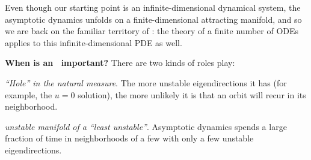 % 
% 
% 
Even though our starting point
is an infinite-dimensional dynamical system, the asymptotic dynamics
unfolds on a finite-dimensional attracting manifold, and so we are back on
the familiar territory of :
the theory of a finite number of ODEs applies to this
infinite-dimensional PDE as well.

    {\bf When is an \eqv\ important?} There are two kinds of roles
{\eqva} play:

{\em ``Hole'' in the natural measure}.
The more unstable eigendirections it has (for example, the
$u=0$ solution), the more unlikely it is  that
an orbit will recur in its neighborhood.

{\em unstable manifold of a ``least unstable''{\eqv}}.
 Asymptotic dynamics
spends  a large fraction of time in
neighborhoods of a few  {\eqva} with
only a few unstable eigendirections.


